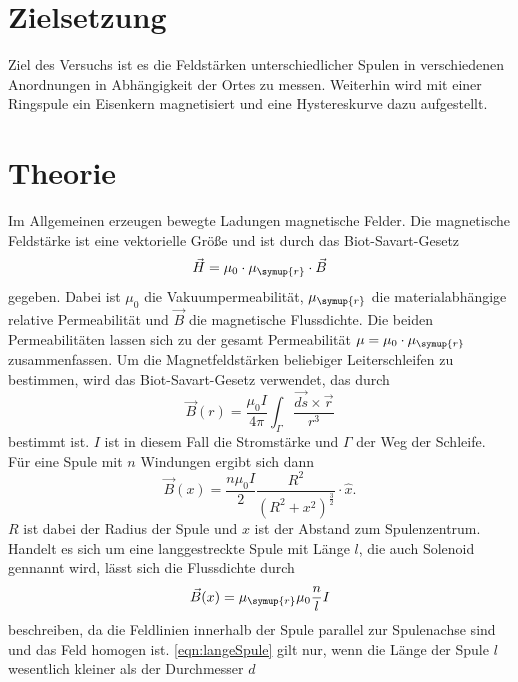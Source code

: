 \section{Zielsetzung}
\label{sec:Zielsetzung}
Ziel des Versuchs ist es die Feldstärken unterschiedlicher Spulen in verschiedenen Anordnungen in
Abhängigkeit der Ortes zu messen. Weiterhin wird mit einer Ringspule ein Eisenkern magnetisiert und eine
Hystereskurve dazu aufgestellt.

\section{Theorie}
\label{sec:Theorie}
Im Allgemeinen erzeugen bewegte Ladungen magnetische Felder. Die magnetische Feldstärke ist eine vektorielle Größe
und ist durch das Biot-Savart-Gesetz
\begin{equation}
    \label{eqn:magFeldstaerke}
    \vec{H} = \mu_{0}\cdot\mu_{\symup{r}}\cdot \vec{B}
\end{equation}
gegeben. Dabei ist $\mu_{0}$ die Vakuumpermeabilität, $\mu_{\symup{r}}$ die materialabhängige relative
Permeabilität und $\vec{B}$ die magnetische Flussdichte. Die beiden Permeabilitäten lassen sich zu der gesamt
Permeabilität $\mu = \mu_0 \cdot \mu_{\symup{r}}$ zusammenfassen. Um die Magnetfeldstärken beliebiger
Leiterschleifen zu bestimmen, wird das Biot-Savart-Gesetz verwendet, das durch
\begin{equation}
    \label{eqn:biotsavart}
    \vec{B}(r) = \frac{\mu_{0}I}{4\pi} \int_{\Gamma} \frac{\vec{ds}\times \vec{r}}{r^3}
\end{equation}
bestimmt ist. $I$ ist in diesem Fall die Stromstärke und $\Gamma$ der Weg der Schleife. Für eine Spule mit
$n$ Windungen ergibt sich dann
\begin{equation}
    \label{eqn:nSpule}
    \vec{B}(x) = \frac{n \mu_0 I}{2} \frac{R^2}{(R^2 + x^2)^{\frac{3}{2}}} \cdot \hat{x}.
\end{equation}
$R$ ist dabei der Radius der Spule und $x$ ist der Abstand zum Spulenzentrum. Handelt es sich um eine
langgestreckte Spule mit Länge $l$, die auch Solenoid gennannt wird, lässt sich die Flussdichte durch
\begin{equation}
    \label{eqn:langeSpule}
    \vec{B}(x) = \mu_{\symup{r}}\mu_0 \frac{n}{l} I
\end{equation}
beschreiben, da die Feldlinien innerhalb der Spule parallel zur Spulenachse sind und das Feld homogen ist.
\autoref{eqn:langeSpule} gilt nur, wenn die Länge der Spule $l$ wesentlich kleiner als der Durchmesser $d$
